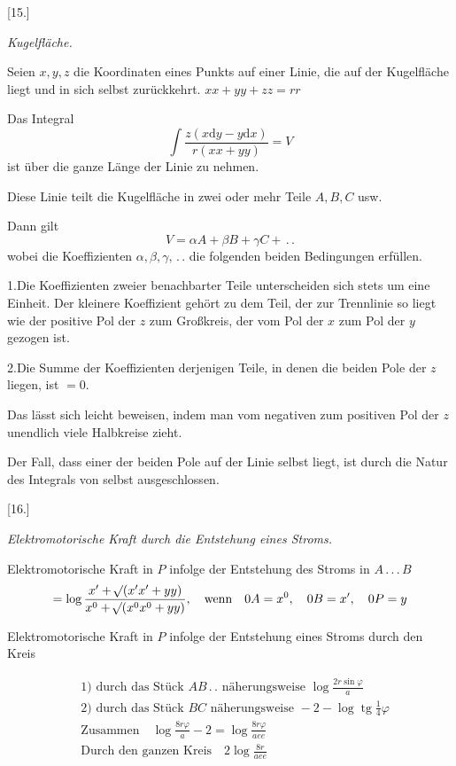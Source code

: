 \begin{center}[15.]\par\medskip\textit{Kugelfläche.}\end{center}
Seien $x,y,z$ die Koordinaten eines Punkts auf einer Linie, die auf der Kugelfläche liegt und in sich selbst zurückkehrt. $xx+yy+zz=rr$

Das Integral
\[
\int\frac{z(x\mathrm dy-y\mathrm dx)}{r(xx+yy)}=V
\]
ist über die ganze Länge der Linie zu nehmen.

Diese Linie teilt die Kugelfläche in zwei oder mehr Teile $A,B,C$ usw.

Dann gilt
\[
V=\alpha A+\beta B+\gamma C+\,.\,.
\]
wobei die Koeffizienten $\alpha,\beta,\gamma,\,.\,.$ die folgenden beiden Bedingungen erfüllen.

1.\quad Die Koeffizienten zweier benachbarter Teile unterscheiden sich stets um eine Einheit. Der kleinere Koeffizient gehört zu dem Teil, der zur Trennlinie so liegt wie der positive Pol der $z$ zum Großkreis, der vom Pol der $x$ zum Pol der $y$ gezogen ist.

2.\quad Die Summe der Koeffizienten derjenigen Teile, in denen die beiden Pole der $z$ liegen, ist $=0$.

Das lässt sich leicht beweisen, indem man vom negativen zum positiven Pol der $z$ unendlich viele Halbkreise zieht.

Der Fall, dass einer der beiden Pole auf der Linie selbst liegt, ist durch die Natur des Integrals von selbst ausgeschlossen.

\begin{center}[16.]\par\medskip\textit{Elektromotorische Kraft durch die Entstehung eines Stroms.}\end{center}
\begin{center}\end{center}
Elektromotorische Kraft in $P$ infolge der Entstehung des Stroms in $A\, .\, .\, .\, B$
\[
=\log\frac{x'+\mathord{{}^{}\!\surd}(x'x'+yy)}{x^0+\mathord{{}^{}\!\surd}(x^0x^0+yy)},\quad\text{wenn}\quad0A=x^0,\quad0B=x',\quad0P=y
\]

Elektromotorische Kraft in $P$ infolge der Entstehung eines Stroms durch den Kreis
\begin{center}\end{center}
\[
\begin{aligned}
&\text{1) durch das Stück }AB\,.\,.\text{ näherungsweise }\log\frac{2r\sin\varphi}{a}\\
&\text{2) durch das Stück }BC\text{ näherungsweise }-2-\log\operatorname{tg}\tfrac14\varphi\\
&\text{Zusammen}\quad\log\frac{8r\varphi}{a}-2=\log\frac{8r\varphi}{aee}\\
&\text{Durch den ganzen Kreis}\quad2\log\frac{8r}{aee}
\end{aligned}
\]

